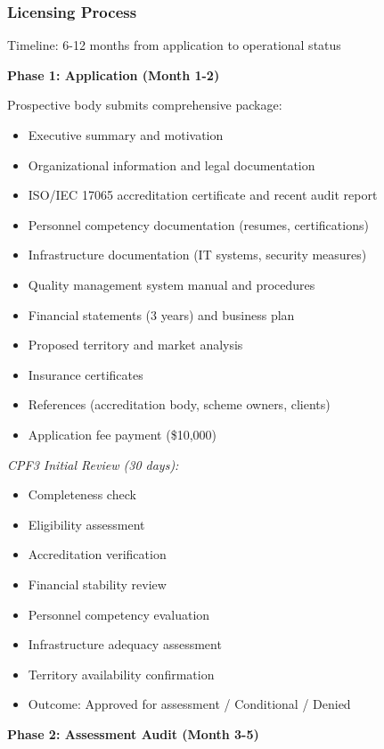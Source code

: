 \documentclass[11pt,a4paper]{article}
\begin{document}
\subsubsection{Licensing Process}

Timeline: 6-12 months from application to operational status

\textbf{Phase 1: Application (Month 1-2)}

Prospective body submits comprehensive package:

\begin{itemize}
\item Executive summary and motivation
\item Organizational information and legal documentation
\item ISO/IEC 17065 accreditation certificate and recent audit report
\item Personnel competency documentation (resumes, certifications)
\item Infrastructure documentation (IT systems, security measures)
\item Quality management system manual and procedures
\item Financial statements (3 years) and business plan
\item Proposed territory and market analysis
\item Insurance certificates
\item References (accreditation body, scheme owners, clients)
\item Application fee payment (\$10,000)
\end{itemize}

\textit{CPF3 Initial Review (30 days):}

\begin{itemize}
\item Completeness check
\item Eligibility assessment
\item Accreditation verification
\item Financial stability review
\item Personnel competency evaluation
\item Infrastructure adequacy assessment
\item Territory availability confirmation
\item Outcome: Approved for assessment / Conditional / Denied
\end{itemize}

\textbf{Phase 2: Assessment Audit (Month 3-5)}
\end{document}
